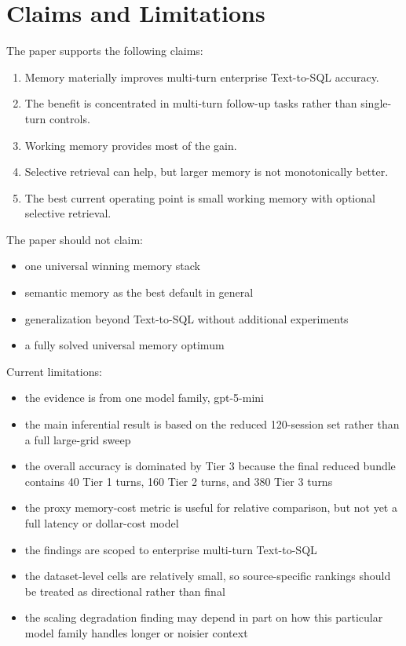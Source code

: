 \documentclass[11pt]{article}
\begin{document}
\section{Claims and Limitations}
The paper supports the following claims:
\begin{enumerate}[leftmargin=1.5em]
  \item Memory materially improves multi-turn enterprise Text-to-SQL accuracy.
  \item The benefit is concentrated in multi-turn follow-up tasks rather than single-turn controls.
  \item Working memory provides most of the gain.
  \item Selective retrieval can help, but larger memory is not monotonically better.
  \item The best current operating point is small working memory with optional selective retrieval.
\end{enumerate}

The paper should not claim:
\begin{itemize}[leftmargin=1.5em]
  \item one universal winning memory stack
  \item semantic memory as the best default in general
  \item generalization beyond Text-to-SQL without additional experiments
  \item a fully solved universal memory optimum
\end{itemize}

Current limitations:
\begin{itemize}[leftmargin=1.5em]
  \item the evidence is from one model family, gpt-5-mini
  \item the main inferential result is based on the reduced 120-session set rather than a full large-grid sweep
  \item the overall accuracy is dominated by Tier 3 because the final reduced bundle contains 40 Tier 1 turns, 160 Tier 2 turns, and 380 Tier 3 turns
  \item the proxy memory-cost metric is useful for relative comparison, but not yet a full latency or dollar-cost model
  \item the findings are scoped to enterprise multi-turn Text-to-SQL
  \item the dataset-level cells are relatively small, so source-specific rankings should be treated as directional rather than final
  \item the scaling degradation finding may depend in part on how this particular model family handles longer or noisier context
\end{itemize}
\end{document}
